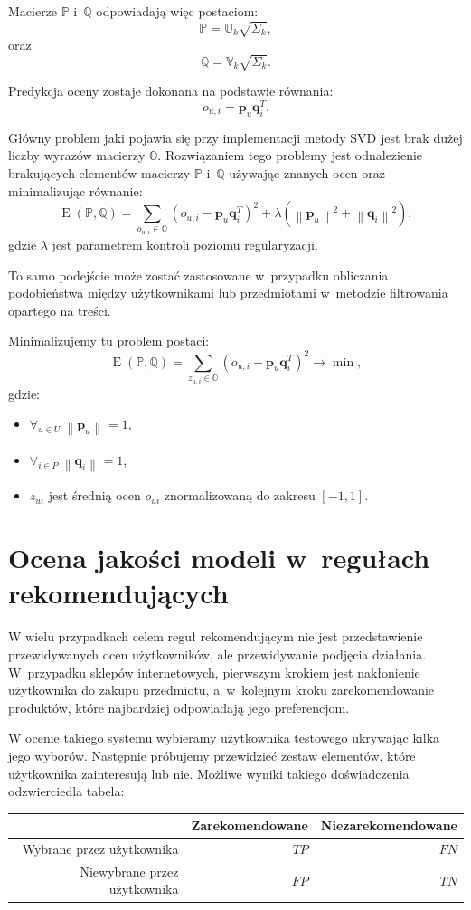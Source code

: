 \documentclass[12pt,a4paper]{report}
\newcommand{\norm}[2][]{\left\| {#2} \right\|_{#1}}
\newcommand{\e}[1]{\operatorname{E}\left({#1} \right)}
\begin{document}
Macierze $\mathbb{P}$ i~$\mathbb{Q}$ odpowiadają więc postaciom:
$$
\mathbb{P}=\mathbb{U}_k \sqrt{\Sigma_k},
$$
oraz 
$$
\mathbb{Q}=\mathbb{V}_k \sqrt{\Sigma_k}.
$$

Predykcja oceny zostaje dokonana na podstawie równania:
$$
o_{u,i} = \mathbf{p}_u \mathbf{q}_i^T.
$$

Główny problem jaki pojawia się przy implementacji metody SVD jest brak dużej liczby wyrazów macierzy $\mathbb{O}$. 
Rozwiązaniem tego problemy jest odnalezienie brakujących elementów macierzy $\mathbb{P}$ i~$\mathbb{Q}$ używając znanych ocen oraz minimalizując równanie:
$$
\e{\mathbb{P}, \mathbb{Q}} = \sum_{o_{u,i} \in \mathbb{O}}(o_{u,i} - \mathbf{p}_u\mathbf{q}_i^T)^2 + \lambda(\norm{\mathbf{p}_u}^2 + \norm{\mathbf{q}_i}^2),
$$
gdzie $\lambda$ jest parametrem kontroli poziomu regularyzacji.

To samo podejście może zostać zastosowane w~przypadku obliczania podobieństwa między użytkownikami lub przedmiotami w~metodzie filtrowania opartego na treści.

Minimalizujemy tu problem postaci:
$$
\e{\mathbb{P}, \mathbb{Q}} = \sum_{z_{u,i} \in \mathbb{O}}(o_{u,i} - \mathbf{p}_u\mathbf{q}_i^T)^2 \to \min,
$$
gdzie:
\begin{itemize}
\item $\forall_{u \in \mathit{U}} \: \norm{\mathbf{p}_u} = 1$,
\item $\forall_{i \in \mathit{P}} \: \norm{\mathbf{q}_i} = 1$,
\item $z_{ui}$ jest średnią ocen $o_{ui}$ znormalizowaną do zakresu $[-1,1]$.
\end{itemize}

\section{Ocena jakości modeli w~regułach rekomendujących}
W wielu przypadkach celem reguł rekomendującym nie jest przedstawienie przewidywanych ocen użytkowników, ale przewidywanie podjęcia działania. W~przypadku sklepów internetowych, pierwszym krokiem jest nakłonienie użytkownika do zakupu przedmiotu, a~w~kolejnym kroku zarekomendowanie produktów, które najbardziej odpowiadają jego preferencjom.

W ocenie takiego systemu wybieramy użytkownika testowego ukrywając kilka jego wyborów. Następnie próbujemy przewidzieć zestaw elementów, które użytkownika zainteresują lub nie. Możliwe wyniki takiego doświadczenia odzwierciedla tabela:
\begin{table}[H]
\begin{center}
\begin{tabular}{|r|r|r|} \hline
 & Zarekomendowane & Niezarekomendowane\\
\hline
Wybrane przez użytkownika & $TP$ & $FN$ \\
\hline
Niewybrane przez użytkownika & $FP$ & $TN$  \\
\hline
\end{tabular}
\end{center}
\end{table}
\end{document}
